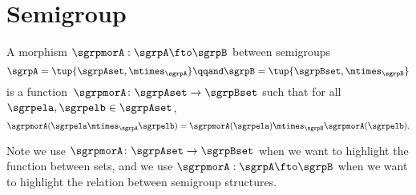 


\section{Semigroup \wHomos}
\label{sec:semigroup-morphisms}

\begin{ctdefinition}
  \label{def:semigroup-mor}
  A morphism $\sgrpmorA: \sgrpA \fto \sgrpB$ between semigroups
  \begin{equation} \label{eq:sgrpAB}
    \sgrpA = \tup{\sgrpAset, \mtimes_\sgrpA}
    \qqand
    \sgrpB = \tup{\sgrpBset, \mtimes_\sgrpB}
  \end{equation}
  is a function~$\sgrpmorA\colon \sgrpAset \to \sgrpBset$
  such that for all $\sgrpela, \sgrpelb \in \sgrpAset$,
  \begin{equation}
    \label{eq:sgrp-mor-comp}
    \sgrpmorA(\sgrpela \mtimes_{\sgrpA} \sgrpelb) = \sgrpmorA (\sgrpela) \mtimes_{\sgrpB} \sgrpmorA(\sgrpelb).
  \end{equation}
\end{ctdefinition}
Note we use $\sgrpmorA\colon \sgrpAset \to \sgrpBset$ when we want to highlight
the function between sets, and we use
$\sgrpmorA: \sgrpA \fto \sgrpB$
when we want to highlight the relation between semigroup structures.

